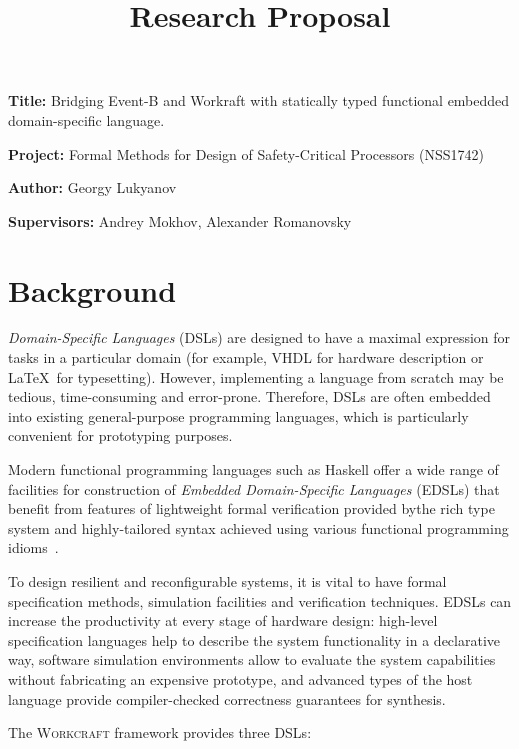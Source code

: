 \documentclass[12pt, a4paper]{article}
\title{Research Proposal}
\author{}
\date{}
\newcommand{\namelistlabel}[1]{\mbox{#1}\hfil}
\newenvironment{namelist}[1]{%
\begin{list}{}
    {
        \let\makelabel\namelistlabel
        \settowidth{\labelwidth}{#1}
        \setlength{\leftmargin}{1.1\labelwidth}
    }
  }{%
\end{list}}
\begin{document}
\maketitle

\begin{namelist}{xxxxxxxxxxxx}
\item[{\bf Title:}]
  Bridging Event-B and Workraft with statically typed functional embedded 
  domain-specific language.
\item[{\bf Project:}]
  Formal Methods for Design of Safety-Critical Processors (NSS1742)
\item[{\bf Author:}]
  Georgy Lukyanov
\item[{\bf Supervisors:}]
  Andrey Mokhov, Alexander Romanovsky
\end{namelist}

\section*{Background} 

\emph{Domain-Specific Languages} (DSLs) are designed to have a maximal 
expression for tasks in a particular domain (for example, VHDL for hardware
description or \LaTeX~for typesetting). However, implementing a language
from scratch may be tedious, time-consuming and error-prone. Therefore,
DSLs are often embedded into existing general-purpose programming languages,
which is particularly convenient for prototyping purposes.

Modern functional programming languages such as Haskell offer a wide range of
facilities for construction of \emph{Embedded Domain-Specific Languages} (EDSLs)
that benefit from features of lightweight formal verification provided bythe
rich type system and highly-tailored syntax achieved using various functional
programming idioms~\cite{HudakDSLs}.

To design resilient and reconfigurable systems, it is vital to have formal
specification methods, simulation facilities and verification techniques.
EDSLs can increase the productivity at every stage of hardware design:
high-level specification
languages help to describe the system functionality in a declarative way,
software simulation environments allow to evaluate the system capabilities
without fabricating an expensive prototype, and advanced types of the host
language provide compiler-checked correctness guarantees for synthesis.

The \textsc{Workcraft} framework provides three DSLs:
\end{document}
